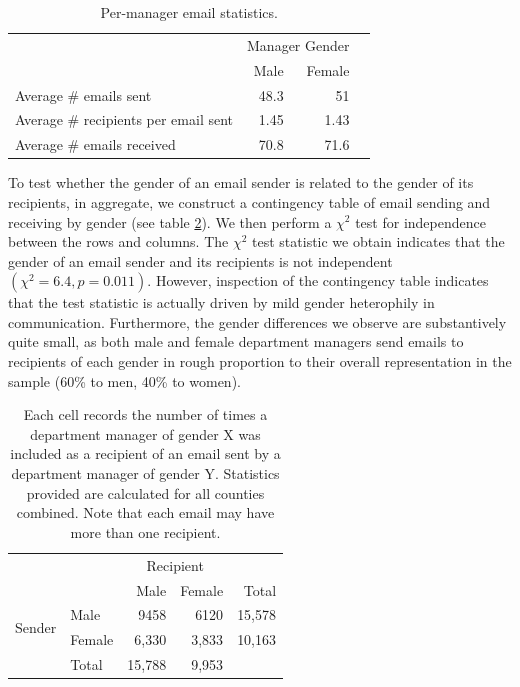 \documentclass{pnastwo}
\begin{document}
\begin{article}
\begin{table}
  \centering
  \begin{tabular}{m{2.1in}rrr}
    \toprule
    & \multicolumn{2}{c}{Manager Gender} \\
    \cmidrule{2-3}
    & Male & Female  \\
    \midrule
    Average \# emails sent & 48.3 & 51 \\
    Average \# recipients per email sent & 1.45 & 1.43 \\
    \midrule
    Average \# emails received & 70.8 & 71.6 \\
    \bottomrule
  \end{tabular}
  \caption{\label{tab:email agg stats} Per-manager email
    statistics.}
\end{table}

To test whether the gender of an email sender is related to the gender of its recipients, in aggregate, we construct a contingency table of email sending and receiving by gender (see table \ref{tab:gender email agg stats}). We then perform a $\chi^2$ test for independence between the rows and columns. The $\chi^2$ test statistic we obtain indicates that the gender of an email sender and its recipients is not independent $(\chi^2 = 6.4, p = 0.011)$. However, inspection of the contingency table indicates that the test statistic is actually driven by mild gender heterophily in communication. Furthermore, the gender differences we observe are substantively quite small, as both male and female department managers send emails to recipients of each gender in rough proportion to their overall representation in the sample (60\% to men, 40\% to women).  
	
	\begin{table}
	\centering
	\begin{tabular}{rlrrr}
	  \toprule
		 && \multicolumn{2}{c}{Recipient} \\
		\cmidrule{3-4}
	& & Male & Female & Total  \\
		 \midrule
		\multirow{2}{*}{Sender} & Male &  9458 & 6120  & 15,578 \\
	& Female & 6,330 & 3,833 & 10,163 \\
	\midrule
		 & Total & 15,788 & 9,953 & \\
		\bottomrule
		\end{tabular}
		\caption{\label{tab:gender email agg stats}Each cell records the number of times a department manager of gender X was included as a recipient of an email sent by a department manager of gender Y. Statistics provided are calculated for all counties combined. Note that each email may have more than one recipient.}
	\end{table}
	

\end{article}
\end{document}
